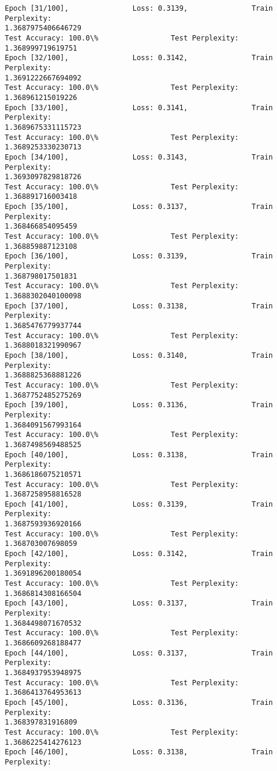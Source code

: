 \documentclass[11pt]{article}
\begin{document}
\begin{Verbatim}[commandchars=\\\{\}]
Epoch [31/100],               Loss: 0.3139,               Train Perplexity:
1.3687975406646729
Test Accuracy: 100.0\%                 Test Perplexity: 1.368999719619751
Epoch [32/100],               Loss: 0.3142,               Train Perplexity:
1.3691222667694092
Test Accuracy: 100.0\%                 Test Perplexity: 1.368961215019226
Epoch [33/100],               Loss: 0.3141,               Train Perplexity:
1.3689675331115723
Test Accuracy: 100.0\%                 Test Perplexity: 1.3689253330230713
Epoch [34/100],               Loss: 0.3143,               Train Perplexity:
1.3693097829818726
Test Accuracy: 100.0\%                 Test Perplexity: 1.368891716003418
Epoch [35/100],               Loss: 0.3137,               Train Perplexity:
1.368466854095459
Test Accuracy: 100.0\%                 Test Perplexity: 1.368859887123108
Epoch [36/100],               Loss: 0.3139,               Train Perplexity:
1.368798017501831
Test Accuracy: 100.0\%                 Test Perplexity: 1.3688302040100098
Epoch [37/100],               Loss: 0.3138,               Train Perplexity:
1.3685476779937744
Test Accuracy: 100.0\%                 Test Perplexity: 1.3688018321990967
Epoch [38/100],               Loss: 0.3140,               Train Perplexity:
1.3688825368881226
Test Accuracy: 100.0\%                 Test Perplexity: 1.3687752485275269
Epoch [39/100],               Loss: 0.3136,               Train Perplexity:
1.3684091567993164
Test Accuracy: 100.0\%                 Test Perplexity: 1.3687498569488525
Epoch [40/100],               Loss: 0.3138,               Train Perplexity:
1.3686186075210571
Test Accuracy: 100.0\%                 Test Perplexity: 1.3687258958816528
Epoch [41/100],               Loss: 0.3139,               Train Perplexity:
1.3687593936920166
Test Accuracy: 100.0\%                 Test Perplexity: 1.368703007698059
Epoch [42/100],               Loss: 0.3142,               Train Perplexity:
1.3691896200180054
Test Accuracy: 100.0\%                 Test Perplexity: 1.3686814308166504
Epoch [43/100],               Loss: 0.3137,               Train Perplexity:
1.3684498071670532
Test Accuracy: 100.0\%                 Test Perplexity: 1.3686609268188477
Epoch [44/100],               Loss: 0.3137,               Train Perplexity:
1.3684937953948975
Test Accuracy: 100.0\%                 Test Perplexity: 1.3686413764953613
Epoch [45/100],               Loss: 0.3136,               Train Perplexity:
1.368397831916809
Test Accuracy: 100.0\%                 Test Perplexity: 1.3686225414276123
Epoch [46/100],               Loss: 0.3138,               Train Perplexity:

\end{Verbatim}
\end{document}
